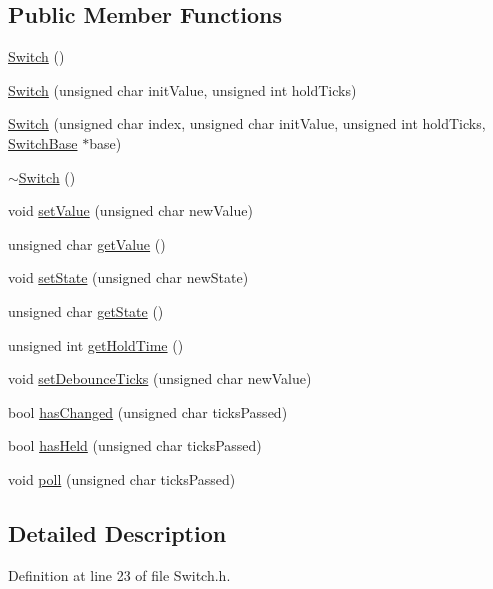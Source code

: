 \subsection*{Public Member Functions}
\begin{DoxyCompactItemize}
\item 
\hyperlink{class_switch_a54db96db46113c6a4904553796d183ce}{Switch} ()
\item 
\hyperlink{class_switch_a44465bb81ffe5495c856653dde8fce95}{Switch} (unsigned char init\+Value, unsigned int hold\+Ticks)
\item 
\hyperlink{class_switch_aeccf02d441097b52da2f6b0ee16c7acd}{Switch} (unsigned char index, unsigned char init\+Value, unsigned int hold\+Ticks, \hyperlink{class_switch_base}{Switch\+Base} $\ast$base)
\item 
\hyperlink{class_switch_ac9e0d5810af5ea21572d5dd7248baed8}{$\sim$\+Switch} ()
\item 
void \hyperlink{class_switch_af4d055387cb6f0a2278db5f0b4f01ede}{set\+Value} (unsigned char new\+Value)
\item 
unsigned char \hyperlink{class_switch_a403dba5cc7695d5d19e62b87e87940fe}{get\+Value} ()
\item 
void \hyperlink{class_switch_a29ddb1bfd9284e52b4adb0063d69371c}{set\+State} (unsigned char new\+State)
\item 
unsigned char \hyperlink{class_switch_a1a4f21940769f45910075ae6df70cae9}{get\+State} ()
\item 
unsigned int \hyperlink{class_switch_ac8a0a047de62c7769c32244f68328edd}{get\+Hold\+Time} ()
\item 
void \hyperlink{class_switch_ad1991a92a3b5c470d667a5e26c59ef59}{set\+Debounce\+Ticks} (unsigned char new\+Value)
\item 
bool \hyperlink{class_switch_a723c543e4e77a985ce0cdf195f6882ab}{has\+Changed} (unsigned char ticks\+Passed)
\item 
bool \hyperlink{class_switch_a6cb0b78f23c412042b31ce8af317c718}{has\+Held} (unsigned char ticks\+Passed)
\item 
void \hyperlink{class_switch_a5401c79fd9fda679eae5e4bba5578a35}{poll} (unsigned char ticks\+Passed)
\end{DoxyCompactItemize}


\subsection{Detailed Description}


Definition at line 23 of file Switch.\+h.



